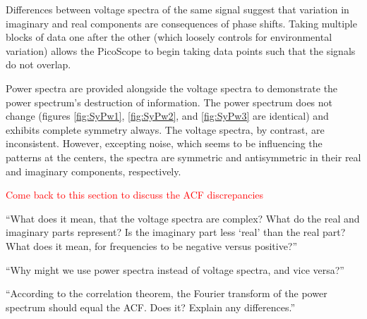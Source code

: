 \documentclass[a4paper]{article}
\begin{document}
Differences between voltage spectra of the same signal suggest that variation in imaginary and real components are consequences of phase shifts. Taking multiple blocks of data one after the other (which loosely controls for environmental variation) allows the PicoScope to begin taking data points such that the signals do not overlap.

Power spectra are provided alongside the voltage spectra to demonstrate the power spectrum's destruction of information. The power spectrum does not change (figures \ref{fig:SyPw1}, \ref{fig:SyPw2}, and \ref{fig:SyPw3} are identical) and exhibits complete symmetry always. The voltage spectra, by contrast, are inconsistent. However, excepting noise, which seems to be influencing the patterns at the centers, the spectra are symmetric and antisymmetric in their real and imaginary components, respectively.


\textcolor{red}{Come back to this section to discuss the ACF discrepancies}

``What does it mean, that the voltage spectra are complex? What do the real and imaginary
parts represent? Is the imaginary part less ‘real’ than the real part? What does it mean, for
frequencies to be negative versus positive?''

``Why might we use power spectra instead of voltage spectra, and vice versa?''

``According to the correlation theorem, the Fourier transform of the power spectrum should equal the ACF. Does it? Explain any differences.''

\
\end{document}

